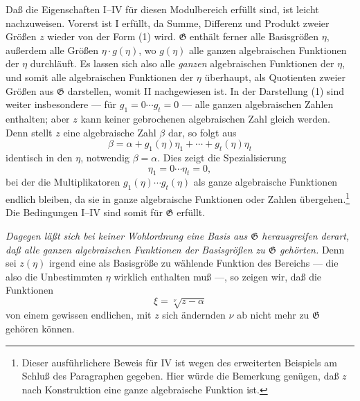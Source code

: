 \documentclass[11pt]{article}
\begin{document}
Daß die Eigenschaften I--IV für diesen Modulbereich erfüllt sind, ist leicht
nachzuweisen. Vorerst ist I erfüllt, da Summe, Differenz und Produkt zweier
Größen $z$ wieder von der Form (1) wird. $\mathfrak G$ enthält ferner alle
Basisgrößen $\eta$, außerdem alle Größen $\eta\cdot g(\eta)$, wo $g(\eta)$ alle
ganzen algebraischen Funktionen der $\eta$ durchläuft. Es lassen sich also alle
\emph{ganzen} algebraischen Funktionen der $\eta$, und somit alle algebraischen
Funktionen der $\eta$ überhaupt, als Quotienten zweier Größen aus $\mathfrak G$
darstellen, womit II nachgewiesen ist. In der Darstellung (1) sind weiter
insbesondere --- für $g_1=0\cdots g_t=0$ --- alle ganzen algebraischen Zahlen
enthalten; aber $z$ kann keiner gebrochenen algebraischen Zahl gleich werden.
Denn stellt $z$ eine algebraische Zahl $\beta$ dar, so folgt aus
\[
 \beta=\alpha+g_1(\eta)\eta_1+\cdots+g_t(\eta)\eta_t
\]
identisch in den $\eta$, notwendig $\beta=\alpha$. Dies zeigt die Spezialisierung
\[
 \eta_1=0\cdots \eta_t=0,
\]
bei der die Multiplikatoren $g_1(\eta)\cdots g_t(\eta)$ als ganze algebraische
Funktionen endlich bleiben, da sie in ganze algebraische Funktionen oder Zahlen
übergehen.\footnote{Dieser ausführlichere Beweis für IV ist wegen des erweiterten
Beispiels am Schluß des Paragraphen gegeben. Hier würde die Bemerkung genügen,
daß $z$ nach Konstruktion eine ganze algebraische Funktion ist.} Die Bedingungen
I--IV sind somit für $\mathfrak G$ erfüllt.

\emph{Dagegen läßt sich bei keiner Wohlordnung eine Basis aus $\mathfrak G$
herausgreifen derart, daß alle ganzen algebraischen Funktionen der Basisgrößen zu
$\mathfrak G$ gehörten.} Denn sei $z(\eta)$ irgend eine als Basisgröße zu
wählende Funktion des Bereichs --- die also die Unbestimmten $\eta$ wirklich
enthalten muß ---, so zeigen wir, daß die Funktionen
\[
 \xi=\sqrt[\nu]{z-\alpha}
\]
von einem gewissen endlichen, mit $z$ sich ändernden $\nu$ ab nicht mehr zu
$\mathfrak G$ gehören können.
\end{document}
